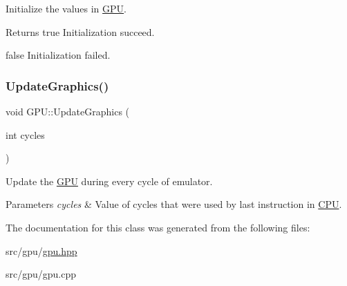 Initialize the values in \mbox{\hyperlink{classGPU}{G\+PU}}. 

\begin{DoxyReturn}{Returns}
true Initialization succeed. 

false Initialization failed. 
\end{DoxyReturn}
\mbox{\label{classGPU_af0b1df5eb7c5270a81fc12aebb89e641}} 
\subsubsection{\texorpdfstring{Update\+Graphics()}{UpdateGraphics()}}
{\footnotesize\ttfamily void G\+P\+U\+::\+Update\+Graphics (\begin{DoxyParamCaption}\item[{int}]{cycles }\end{DoxyParamCaption})}



Update the \mbox{\hyperlink{classGPU}{G\+PU}} during every cycle of emulator. 


\begin{DoxyParams}{Parameters}
{\em cycles} & Value of cycles that were used by last instruction in \mbox{\hyperlink{classCPU}{C\+PU}}. \\
\hline
\end{DoxyParams}


The documentation for this class was generated from the following files\+:\begin{DoxyCompactItemize}
\item 
src/gpu/\mbox{\hyperlink{gpu_8hpp}{gpu.\+hpp}}\item 
src/gpu/gpu.\+cpp\end{DoxyCompactItemize}
